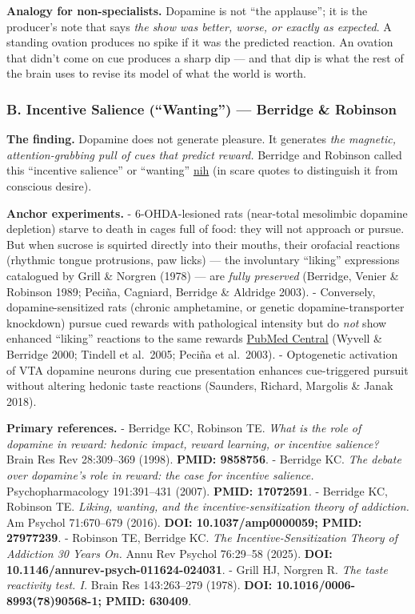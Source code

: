 \textbf{Analogy for non-specialists.} Dopamine is not ``the applause''; it is the producer's note that says \emph{the show was better, worse, or exactly as expected}. A standing ovation produces no spike if it was the predicted reaction. An ovation that didn't come on cue produces a sharp dip --- and that dip is what the rest of the brain uses to revise its model of what the world is worth.

\subsubsection{B. Incentive Salience (``Wanting'') --- Berridge \& Robinson}\label{01_dopamine_substrate-b.-incentive-salience-wanting-berridge-robinson}

\textbf{The finding.} Dopamine does not generate pleasure. It generates \emph{the magnetic, attention-grabbing pull of cues that predict reward.} Berridge and Robinson called this ``incentive salience'' or ``wanting'' \href{https://www.ncbi.nlm.nih.gov/pmc/articles/PMC11773642/}{nih} (in scare quotes to distinguish it from conscious desire).

\textbf{Anchor experiments.} - 6-OHDA-lesioned rats (near-total mesolimbic dopamine depletion) starve to death in cages full of food: they will not approach or pursue. But when sucrose is squirted directly into their mouths, their orofacial reactions (rhythmic tongue protrusions, paw licks) --- the involuntary ``liking'' expressions catalogued by Grill \& Norgren (1978) --- are \emph{fully preserved} (Berridge, Venier \& Robinson 1989; Peciña, Cagniard, Berridge \& Aldridge 2003). - Conversely, dopamine-sensitized rats (chronic amphetamine, or genetic dopamine-transporter knockdown) pursue cued rewards with pathological intensity but do \emph{not} show enhanced ``liking'' reactions to the same rewards \href{https://pmc.ncbi.nlm.nih.gov/articles/PMC2813042/}{PubMed Central} (Wyvell \& Berridge 2000; Tindell et al.~2005; Peciña et al.~2003). - Optogenetic activation of VTA dopamine neurons during cue presentation enhances cue-triggered pursuit without altering hedonic taste reactions (Saunders, Richard, Margolis \& Janak 2018).

\textbf{Primary references.} - Berridge KC, Robinson TE. \emph{What is the role of dopamine in reward: hedonic impact, reward learning, or incentive salience?} Brain Res Rev 28:309--369 (1998). \textbf{PMID: 9858756}. - Berridge KC. \emph{The debate over dopamine's role in reward: the case for incentive salience.} Psychopharmacology 191:391--431 (2007). \textbf{PMID: 17072591}. - Berridge KC, Robinson TE. \emph{Liking, wanting, and the incentive-sensitization theory of addiction.} Am Psychol 71:670--679 (2016). \textbf{DOI: 10.1037/amp0000059; PMID: 27977239}. - Robinson TE, Berridge KC. \emph{The Incentive-Sensitization Theory of Addiction 30 Years On.} Annu Rev Psychol 76:29--58 (2025). \textbf{DOI: 10.1146/annurev-psych-011624-024031}. - Grill HJ, Norgren R. \emph{The taste reactivity test. I.} Brain Res 143:263--279 (1978). \textbf{DOI: 10.1016/0006-8993(78)90568-1; PMID: 630409}.

